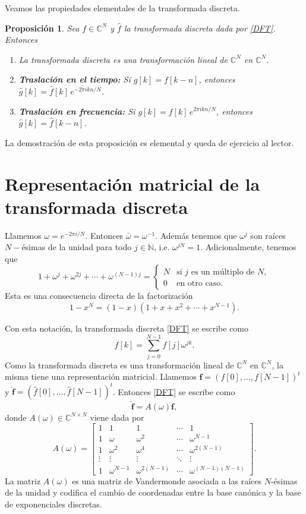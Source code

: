 \documentclass[12pt, a4paper]{amsbook}
\newcommand{\C}{{\mathbb C}}
\newcommand{\N}{{\mathbb N}}
\newcommand{\ff}{{\mathbf f}}
\newtheorem{prop}[teo]{Proposición}
\theoremstyle{remark}
\theoremstyle{definition}
\numberwithin{section}{chapter}
\numberwithin{subsection}{section}
\numberwithin{equation}{section}
\numberwithin{figure}{chapter}
\begin{document}
Veamos las propiedades elementales de la transformada discreta.
\begin{prop}
Sea $f\in \C^N$ y $\hat f$ la transformada discreta dada por \eqref{DFT}. Entonces
\begin{enumerate}
\item La transformada discreta es una transformación lineal de $\C^N$ en $\C^N$.

\item \textbf{Traslación en el tiempo:} Si $g[k] = f[k-n]$, entonces $\hat g[k] = \hat f[k]\, e^{-2\pi ikn/N}$.

\item \textbf{Traslación en frecuencia:} Si $g[k] = f[k]\, e^{2\pi i kn/N}$, entonces $\hat g[k] = \hat f[k-n]$.
\end{enumerate}
\end{prop}
La demostración de esta proposición es elemental y queda de ejercicio al lector.

\section{Representación matricial de la transformada discreta}\label{sec:matricial}

Llamemos $\omega = e^{-2\pi i/N}$. Entonces $\bar \omega = \omega^{-1}$. Además tenemos que $\omega^j$ son raíces $N-$ésimas de la unidad para todo $j\in\N$, i.e. $\omega^{jN}=1$. Adicionalmente, tenemos que
$$
1+\omega^j + \omega^{2j} + \cdots + \omega^{(N-1)j} = \begin{cases}
N & \text{si $j$ es un múltiplo de $N$},\\
0 & \text{en otro caso}.
\end{cases}
$$
Esta es una consecuencia directa de la factorización 
$$
1-x^N = (1-x)(1+x+x^2+\cdots+x^{N-1}).
$$

Con esta notación, la transformada discreta \eqref{DFT} se escribe como
$$
\hat f[k] = \sum_{j=0}^{N-1} f[j] \omega^{jk}.
$$
Como la transformada discreta es una transformación lineal de $\C^N$ en $\C^N$, la misma tiene una representación matricial. Llamemos $\ff = (f[0],\dots,f[N-1])^t$ y $\hat \ff = (\hat f[0],\dots,\hat f[N-1])^t$. Entonces \eqref{DFT} se escribe como
$$
\hat\ff = A(\omega)\ff,
$$
donde $A(\omega)\in \C^{N\times N}$ viene dada por
$$
A(\omega) = \begin{bmatrix}
1 & 1 & 1 & \cdots & 1\\
1 & \omega & \omega^2 & \cdots & \omega^{N-1}\\
1 & \omega^2 & \omega^4 & \cdots & \omega^{2(N-1)}\\
\vdots & \vdots & \vdots & \ddots & \vdots\\
1 & \omega^{N-1} & \omega^{2(N-1)} & \cdots & \omega^{(N-1)(N-1)}
\end{bmatrix}.
$$
La matriz $A(\omega)$ es una matriz de Vandermonde asociada a las raíces $N$-ésimas de la unidad y codifica el cambio de coordenadas entre la base canónica y la base de exponenciales discretas.
\end{document}

